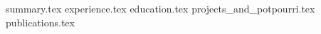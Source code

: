 \documentclass[11pt, letter]{awesome-cv}
\newcommand*{\sectiondir}{resume/}
\begin{document}
\makecvheader
\vspace{-0.4em}
{summary.tex}
\vspace{-0.4em}
{experience.tex}
\vspace{-0.4em}
{education.tex}
\vspace{-0.4em}
{projects_and_potpourri.tex}
\vspace{-0.4em}
{publications.tex}
\vspace{-0.4em}
\end{document}

